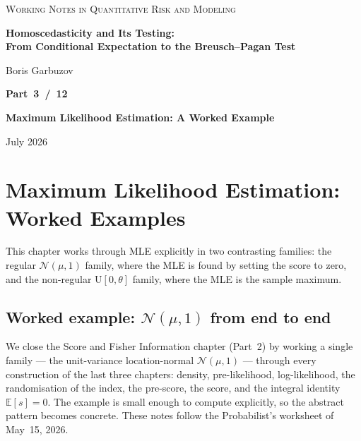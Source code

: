 \documentclass[a4paper,oneside,12pt]{extarticle}
\theoremstyle{plain}
\theoremstyle{definition}
\theoremstyle{remark}
\newcommand*{\E}{\mathbb{E}}
\begin{document}
\begin{titlepage}
\begin{center}

{\footnotesize\scshape\color{gray}
Working Notes in Quantitative Risk and Modeling
}

\vfill

{\LARGE\bfseries Homoscedasticity and Its Testing:\\[4pt]
From Conditional Expectation to the Breusch--Pagan Test}

\vspace{36pt}

{\normalsize Boris Garbuzov}

\vfill

{\Large\bfseries Part~3~/~12}

\vspace{6pt}

{\Large\bfseries Maximum Likelihood Estimation: A Worked Example}

\vfill

{\small July 2026}

\end{center}
\end{titlepage}

\setcounter{tocdepth}{2}
\tableofcontents
\newpage
\section{Maximum Likelihood Estimation: Worked Examples}
\label{sec:mle_worked_examples}

This chapter works through MLE explicitly in two contrasting
families: the regular $\mathcal{N}(\mu,1)$ family, where the MLE
is found by setting the score to zero, and the non-regular
$\mathrm{U}[0,\theta]$ family, where the MLE is the sample maximum.

\subsection{Worked example: $\mathcal{N}(\mu,1)$ from end to end}
\label{sec:normal_example_end_to_end}

We close the Score and Fisher Information chapter (Part~2) by working a single
family --- the unit-variance location-normal $\mathcal{N}(\mu,1)$
--- through every construction of the last three chapters: density,
pre-likelihood, log-likelihood, the randomisation of the index, the
pre-score, the score, and the integral identity $\E[s]=0$.  The
example is small enough to compute explicitly, so the abstract
pattern becomes concrete.  These notes follow the Probabilist's
worksheet of May~15, 2026.
\end{document}
